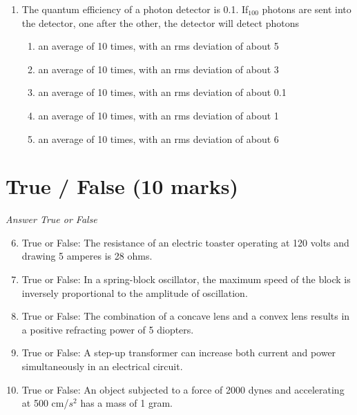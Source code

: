 \documentclass[12pt]{article}
\begin{document}
\begin{enumerate}[label=\arabic*.]
\begin{enumerate}[label=(\alph*)]
    \item ^6\_3 Li
    \item ^5\_2 He
\end{enumerate}
\item The quantum efficiency of a photon detector is 0.1. If$_{100}$ photons are sent into the detector, one after the other, the detector will detect photons
\begin{enumerate}[label=(\alph*)]
    \item an average of 10 times, with an rms deviation of about 5
    \item an average of 10 times, with an rms deviation of about 3
    \item an average of 10 times, with an rms deviation of about 0.1
    \item an average of 10 times, with an rms deviation of about 1
    \item an average of 10 times, with an rms deviation of about 6
\end{enumerate}
\end{enumerate}

\section*{True / False (10 marks)}
\textit{Answer True or False}
\begin{enumerate}[label=\arabic*.]
\setcounter{enumi}{5}
\item True or False: The resistance of an electric toaster operating at 120 volts and drawing 5 amperes is 28 ohms.
\item True or False: In a spring-block oscillator, the maximum speed of the block is inversely proportional to the amplitude of oscillation.
\item True or False: The combination of a concave lens and a convex lens results in a positive refracting power of 5 diopters.
\item True or False: A step-up transformer can increase both current and power simultaneously in an electrical circuit.
\item True or False: An object subjected to a force of 2000 dynes and accelerating at 500 cm/$s^2$ has a mass of 1 gram.
\end{enumerate}
\end{document}
